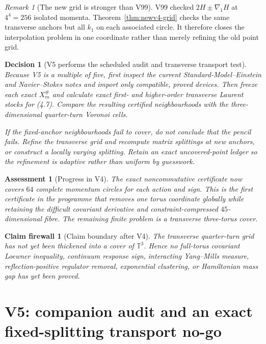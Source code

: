 \documentclass[11pt,oneside]{article}
\newtheorem{assessment}[theorem]{Assessment}
\newtheorem{firewall}[theorem]{Claim firewall}
\newtheorem{decision}[theorem]{Decision}
\theoremstyle{definition}
\theoremstyle{remark}
\newtheorem{remark}[theorem]{Remark}
\begin{document}
\begin{remark}[The new grid is stronger than V99]
\label{rem:newv4-strength}
V99 checked \(2H\pm\nabla_1H\) at \(4^4=256\) isolated momenta.
Theorem~\ref{thm:newv4-grid} checks the same transverse anchors but
all \(k_1\) on each associated circle.  It therefore closes the
interpolation problem in one coordinate rather than merely refining
the old point grid.
\end{remark}

\begin{decision}[V5 performs the scheduled audit and transverse transport test]
\label{dec:newv4-next}
Because V5 is a multiple of five, first inspect the current
Standard-Model--Einstein and Navier--Stokes notes and import only
compatible, proved devices.  Then freeze each exact
\(X_m^\#\) and calculate exact first- and higher-order transverse
Laurent stocks for (4.7).  Compare the resulting certified
neighbourhoods with the three-dimensional quarter-turn Voronoi
cells.

If the fixed-anchor neighbourhoods fail to cover, do not conclude
that the pencil fails.  Refine the transverse grid and recompute
matrix splittings at new anchors, or construct a locally varying
splitting.  Retain an exact uncovered-point ledger so the refinement
is adaptive rather than uniform by guesswork.
\end{decision}

\begin{assessment}[Progress in V4]
\label{ass:newv4-progress}
The exact noncommutative certificate now covers \(64\) complete
momentum circles for each action and sign.  This is the first
certificate in the programme that removes one torus coordinate
globally while retaining the difficult covariant derivative and
constraint-compressed \(45\)-dimensional fibre.  The remaining
finite problem is a transverse three-torus cover.
\end{assessment}

\begin{firewall}[Claim boundary after V4]
\label{fire:newv4-final}
The transverse quarter-turn grid has not yet been thickened into a
cover of \(\mathbb T^3\).  Hence no full-torus covariant Loewner
inequality, continuum response sign, interacting Yang--Mills
measure, reflection-positive regulator removal, exponential
clustering, or Hamiltonian mass gap has yet been proved.
\end{firewall}

\section{V5: companion audit and an exact fixed-splitting transport no-go}
\label{sec:newv5-audit-transport}
\end{document}
